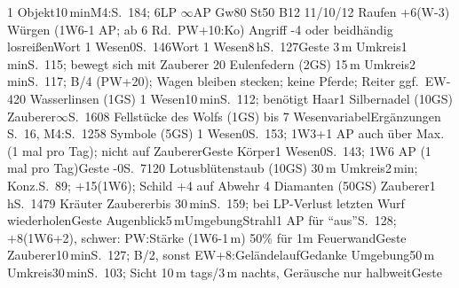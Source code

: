 \documentclass{m5figur-mv}[2015/01/02]
\begin{document}
{%
  {1 Objekt}{10\,min}{M4:S.~184; 6LP $\infty$AP Gw80 St50 B12 11/10/12
  Raufen +6(W-3) Würgen (1W6-1 AP; ab 6 Rd.\ PW+10:Ko)
  Angriff -4 oder beidhändig losreißen}{Wort}
%
  {1 Wesen}{0}{S.~146}{Wort}
%
  {1 Wesen}{8\,h}{S.~127}{Geste}
%
  {3\,m Umkreis}{1\,min}{S.~115; bewegt sich mit Zauberer}%
  {20 Eulenfedern (2GS)}
%
  {15\,m Umkreis}{2\,min}{S.~117; B/4 (PW+20); Wagen bleiben stecken;
  keine Pferde; Reiter ggf.\ EW-4}{20 Wasserlinsen (1GS)}
%
  {1 Wesen}{10\,min}{S.~112; benötigt Haar}{1 Silbernadel (10GS)}
%
  {Zauberer}{$\infty$}{S.~160}{8 Fellstücke des Wolfs (1GS)}
%
  {bis 7 Wesen}{variabel}{Ergänzungen S.~16, M4:S.~125}{8 Symbole (5GS)}
%
  {1 Wesen}{0}{S.~153; 1W3+1 AP auch über Max. (1 mal pro Tag);
  nicht auf Zauberer}{Geste}
%
  {Körper}{1 Wesen}{0}{S.~143; 1W6 AP (1 mal pro Tag)}{Geste}
%
  {-}{0}{S.~71}{20 Lotusblütenstaub (10GS)}
%
  {30\,m Umkreis}{2\,min; Konz.}{S.~89; +15(1W6); Schild +4 auf Abwehr}%
  {4 Diamanten (50GS)}
%
  {Zauberer}{1\,h}{S.~147}{9 Kräuter}
%
  {Zauberer}{bis 30\,min}{S.~159;
  bei LP-Verlust letzten Wurf wiederholen}{Geste}
%
  {Augenblick}{5\,m}{Umgebung}{Strahl}{1 AP für "`aus"'}{S.~128;
  +8(1W6+2), schwer: PW:Stärke (1W6-1\,m) 50\% für 1m Feuerwand}{Geste}
%
  {Zauberer}{10\,min}{S.~127; B/2, sonst EW+8:Geländelauf}{Gedanke}
%
  {Umgebung}{50\,m Umkreis}{30\,min}{S.~103; Sicht 10\,m tags/3\,m nachts,
  Geräusche nur halbweit}{Geste}



}%
\end{document}
